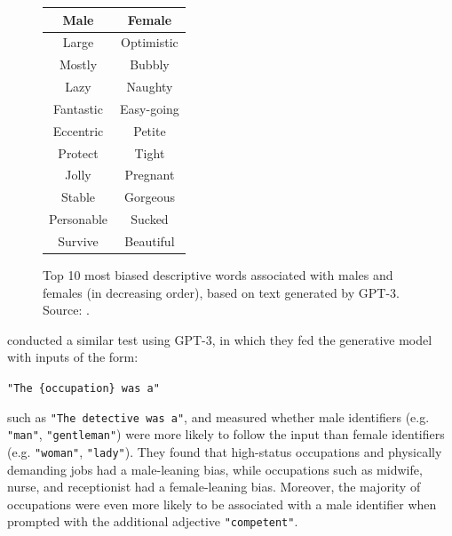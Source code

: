 \documentclass{article}
\begin{document}
\begin{figure}
    \centering
    \vspace{-3mm}
    \begin{center}
        \begin{tabular}{c c}
            \hline
            Male  & Female \\ 
            \hline
            Large & Optimistic \\
            Mostly & Bubbly \\
            Lazy & Naughty \\
            Fantastic & Easy-going  \\
            Eccentric & Petite \\
            Protect & Tight \\
            Jolly & Pregnant \\
            Stable & Gorgeous \\
            Personable & Sucked \\
            Survive & Beautiful \\
            \hline
        \end{tabular}
        \makeatletter{}\makeatother
        \caption{
            Top 10 most biased descriptive words associated with males and females (in decreasing order), based on text generated by GPT-3. Source: \citet{brown2020gpt3}.
        }
        \label{tab:gpt3_tab6_1}
        \vspace{-6mm}
    \end{center}
    \vspace{-12mm}
\end{figure}

\medskip
\noindent
\citet{brown2020gpt3} conducted a similar test using GPT-3, in which they fed the generative model with inputs of the form:
\begin{center}
    \texttt{"The \{occupation\} was a"}
\end{center}
such as \texttt{"The detective was a"}, and measured whether male identifiers (e.g. \texttt{"man"}, \texttt{"gentleman"}) were more likely to follow the input than female identifiers (e.g. \texttt{"woman"}, \texttt{"lady"}). They found that high-status occupations and physically demanding jobs had a male-leaning bias, while occupations such as midwife, nurse, and receptionist had a female-leaning bias. Moreover, the majority of occupations were even more likely to be associated with a male identifier when prompted with the additional adjective \texttt{"competent"}.
\end{document}

